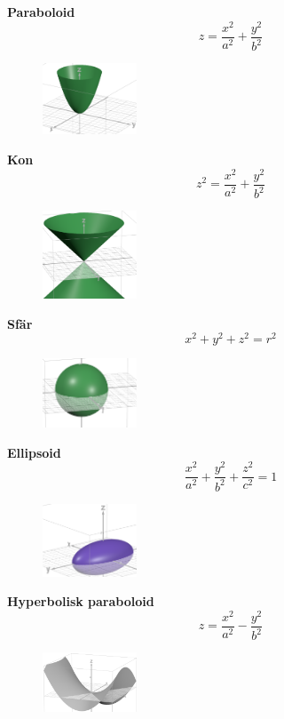\documentclass[a4paper,12pt]{article}
\begin{document}
\textbf{Paraboloid}
\[
z = \frac{x^2}{a^2} + \frac{y^2}{b^2}
\]
\begin{figure}[H]
  \centering
  \includegraphics[width=0.25\textwidth]{paraboloid.png}
  \caption{}
\end{figure}

\textbf{Kon}
\[
z^2 = \frac{x^2}{a^2} + \frac{y^2}{b^2}
\]
\begin{figure}[H]
  \centering
  \includegraphics[width=0.25\textwidth]{kon.png}
  \caption{}
\end{figure}

\textbf{Sfär}
\[
x^2 + y^2 + z^2 = r^2
\]
\begin{figure}[H]
  \centering
  \includegraphics[width=0.25\textwidth]{sfar.png}
  \caption{}
\end{figure}

\textbf{Ellipsoid}
\[
\frac{x^2}{a^2} + \frac{y^2}{b^2} + \frac{z^2}{c^2} = 1
\]
\begin{figure}[H]
  \centering
  \includegraphics[width=0.25\textwidth]{ellipsoid.png}
  \caption{}
\end{figure}

\textbf{Hyperbolisk paraboloid}
\[
z = \frac{x^2}{a^2} - \frac{y^2}{b^2}
\]
\begin{figure}[H]
  \centering
  \includegraphics[width=0.25\textwidth]{hyperboliskparaboloid.png}
  \caption{}
\end{figure}
\end{document}
